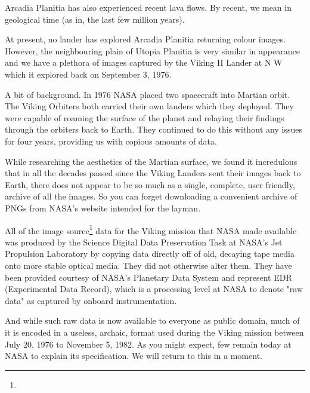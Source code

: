 Arcadia Planitia has also experienced recent lava flows. By recent, we mean in geological time (as in, the last few million years).


At present, no lander has explored Arcadia Planitia returning colour images. However, the neighbouring plain of Utopia Planitia is very similar in appearance and we have a plethora of images captured by the Viking II Lander at N W which it explored back on September 3, 1976.

A bit of background. In 1976 NASA placed two spacecraft into Martian orbit. The Viking Orbiters both carried their own landers which they deployed. They were capable of roaming the surface of the planet and relaying their findings through the orbiters back to Earth. They continued to do this without any issues for four years, providing us with copious amounts of data. 


While researching the aesthetics of the Martian surface, we found it incredulous that in all the decades passed since the Viking Landers sent their images back to Earth, there does not appear to be so much as a single, complete, user friendly, archive of all the images. So you can forget downloading a convenient archive of PNGs from NASA's website intended for the layman.

All of the image source\footnote{} data for the Viking mission that NASA made available was produced by the Science Digital Data Preservation Task at NASA's Jet Propulsion Laboratory by copying data directly off of old, decaying tape media onto more stable optical media. They did not otherwise alter them. They have been provided courtesy of NASA's Planetary Data System and represent EDR (Experimental Data Record), which is a processing level at NASA to denote "raw data" as captured by onboard instrumentation.

And while such raw data is now available to everyone as public domain, much of it is encoded in a useless, archaic, format used during the Viking mission between July 20, 1976 to November 5, 1982. As you might expect, few remain today at NASA to explain its specification. We will return to this in a moment.

